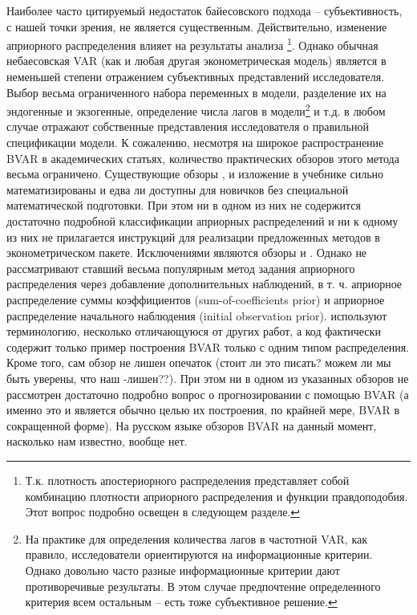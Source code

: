 \documentclass[11pt]{article} %
\begin{document}
Наиболее часто цитируемый недостаток байесовского подхода -- субъективность, с нашей точки зрения, не является существенным. Действительно, изменение априорного распределения влияет на  результаты анализа \footnote{Т.к. плотность апостериорного распределения представляет собой комбинацию плотности априорного распределения и функции правдоподобия. Этот вопрос подробно освещен в следующем разделе.}. Однако обычная небаесовская VAR (как и любая другая эконометрическая модель) является в неменьшей степени отражением субъективных представлений исследователя. Выбор весьма ограниченного набора переменных в модели, разделение их на эндогенные и экзогенные, определение числа лагов в модели\footnote{На практике для определения количества лагов в частотной VAR, как правило, исследователи ориентируются на информационные критерии. Однако довольно часто разные информационные критерии дают противоречивые результаты. В этом случае предпочтение определенного критерия всем остальным -- есть тоже субъективное решение.} и т.д. в любом случае отражают собственные представления исследователя о правильной спецификации модели.    
К сожалению, несмотря на широкое распространение BVAR в академических статьях, количество практических обзоров этого метода  весьма ограничено. Существующие обзоры \cite{karlsson_2012}, \cite{delnegro_schorfheide_2011} и изложение в учебнике \cite{canova_2007} сильно математизированы и едва ли доступны для новичков без специальной математической подготовки.
 При этом ни в одном из них не содержится достаточно подробной классификации априорных распределений и ни к одному из них не прилагается инструкций для реализации предложенных методов в эконометрическом пакете. 
Исключениями являются обзоры \cite{koop_korobilis_2010} и \cite{blake_mumtaz_2012}.
Однако \cite{koop_korobilis_2010} не рассматривают ставший весьма популярным метод задания априорного распределения через добавление дополнительных наблюдений, в т. ч. априорное распределение суммы коэффициентов (sum-of-coefficients prior) и априорное распределение начального наблюдения (initial observation prior).  
\cite{blake_mumtaz_2012} используют терминологию, несколько отличающуюся от других работ, а код фактически содержит только пример построения BVAR только с одним типом распределения. Кроме того, сам обзор не лишен опечаток (стоит ли это писать? можем ли мы быть уверены, что наш -лишен??). При этом ни в одном из указанных обзоров не рассмотрен достаточно подробно вопрос о прогнозировании с помощью BVAR (а именно это и является обычно целью их построения, по крайней мере, BVAR в сокращенной форме). На русском языке обзоров BVAR на данный момент, насколько нам  известно, вообще нет. 
\end{document}
